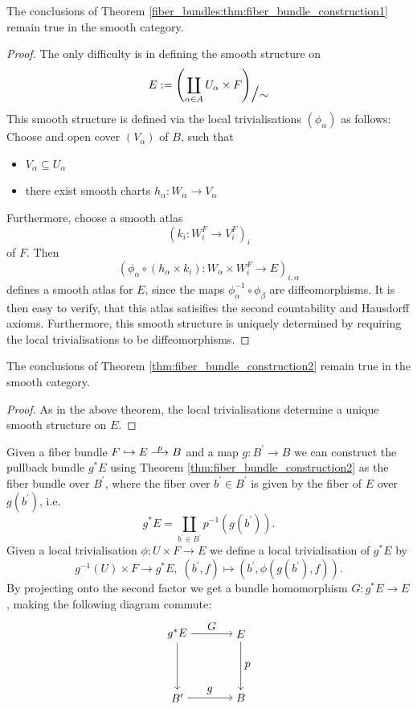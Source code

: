     \begin{theorem}
        The conclusions of Theorem \ref{fiber_bundles:thm:fiber_bundle_construction1} remain true in the smooth category. 
    \end{theorem}
    \begin{proof}
        The only difficulty is in defining the smooth structure on 
        \[
            E := \left( \coprod_{\alpha \in A} U_\alpha \times F \right)_{\raisebox{5pt}{\scalebox{1.5}{$/$}}\raisebox{5pt}{\scalebox{1.05}{$\sim$}}}
        \]
        This smooth structure is defined via the local trivialisations $(\phi_\alpha)$ as follows: Choose and open cover $(V_\alpha)$ of $B$, such that
        \begin{itemize}
            \item $V_\alpha \subseteq U_\alpha$
            \item there exist smooth charts $h_\alpha \colon W_\alpha \to V_\alpha$
        \end{itemize}
        Furthermore, choose a smooth atlas
        \[
        (k_i \colon W_i^F \to V_i^F)_i
        \]
        of $F$. Then 
        \[
        (\phi_\alpha \circ (h_\alpha \times k_i) \colon W_\alpha \times W_i^F \to E)_{i,\alpha}
        \]
        defines a smooth atlas for $E$, since the maps $\phi_\alpha^{-1} \circ \phi_\beta$ are diffeomorphisms. It is then easy to verify, that this atlas satisifies the second countability and Hausdorff axioms. Furthermore, this smooth structure is uniquely determined by requiring the local trivialisations to be diffeomorphisms.
    \end{proof}

    \begin{theorem}
        \label{thm:fiber_bundle_construction2_smooth}
        The conclusions of Theorem \ref{thm:fiber_bundle_construction2} remain true in the smooth category. 
    \end{theorem}
    \begin{proof}
        As in the above theorem, the local trivialisations determine a unique smooth structure on $E$.
    \end{proof}

    \hypertarget{fiber_bundles:headline:pullback_bundles}{}

    Given a fiber bundle $F \hookrightarrow E \oset[0.7pt]{\scalebox{0.8}{$p$}}{\longrightarrow} B$ and a map $g \colon B^\prime \to B$ we can construct the pullback bundle $g^*E$ using Theorem \ref{thm:fiber_bundle_construction2} as the fiber bundle over $B^\prime$, where the fiber over $b^\prime \in B^\prime$ is given by the fiber of $E$ over $g(b^\prime)$, i.e.
    \[
    g^*E = \coprod_{b^\prime \in B^\prime} p^{-1}(g(b^\prime)).
    \]
    Given a local trivialisation $\phi \colon U \times F \to E$ we define a local trivialisation of $g^*E$ by
    \[
    g^{-1}(U) \times F \to g^*E, \; (b^\prime,f) \mapsto (b^\prime,\phi(g(b^\prime),f)).
    \]
    By projecting onto the second factor we get a bundle homomorphism $G \colon g^*E \to E$, making the following diagram commute:
    \[
        \commsquare{$g^*E$}{$E$}{$B^\prime$}{$B$}{$G$}{}{$p$}{$g$}
    \]

